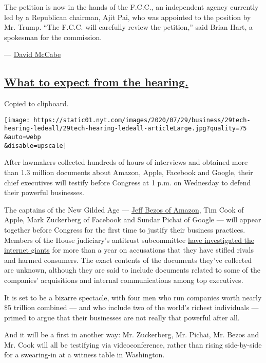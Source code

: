 The petition is now in the hands of the F.C.C., an independent agency
currently led by a Republican chairman, Ajit Pai, who was appointed to
the position by Mr. Trump. ``The F.C.C. will carefully review the
petition,'' said Brian Hart, a spokesman for the commission.

--- \href{https://www.nytimes.com/by/david-mccabe}{David McCabe}

\hypertarget{what-to-expect-from-the-hearing}{%
\subsection{\texorpdfstring{\protect\hyperlink{what-to-expect-from-the-hearing}{What
to expect from the
hearing.}}{What to expect from the hearing.}}\label{what-to-expect-from-the-hearing}}

Copied to clipboard.

\texttt{[image: https://static01.nyt.com/images/2020/07/29/business/29tech-hearing-ledeall/29tech-hearing-ledeall-articleLarge.jpg?quality=75\\\&auto=webp\\\&disable=upscale]}

After lawmakers collected hundreds of hours of interviews and obtained
more than 1.3 million documents about Amazon, Apple, Facebook and
Google, their chief executives will testify before Congress at 1 p.m. on
Wednesday to defend their powerful businesses.

The captains of the New Gilded Age ---
\href{https://www.nytimes.com/2020/07/27/business/jeff-bezos-amazon-congress.html}{Jeff
Bezos of Amazon}, Tim Cook of Apple, Mark Zuckerberg of Facebook and
Sundar Pichai of Google --- will appear together before Congress for the
first time to justify their business practices. Members of the House
judiciary's antitrust subcommittee
\href{https://www.nytimes.com/2019/06/11/technology/antitrust-hearing.html}{have
investigated the internet giants} for more than a year on accusations
that they have stifled rivals and harmed consumers. The exact contents
of the documents they've collected are unknown, although they are said
to include documents related to some of the companies' acquisitions and
internal communications among top executives.

It is set to be a bizarre spectacle, with four men who run companies
worth nearly \$5 trillion combined --- and who include two of the
world's richest individuals --- primed to argue that their businesses
are not really that powerful after all.

And it will be a first in another way: Mr. Zuckerberg, Mr. Pichai, Mr.
Bezos and Mr. Cook will all be testifying via videoconference, rather
than rising side-by-side for a swearing-in at a witness table in
Washington.

